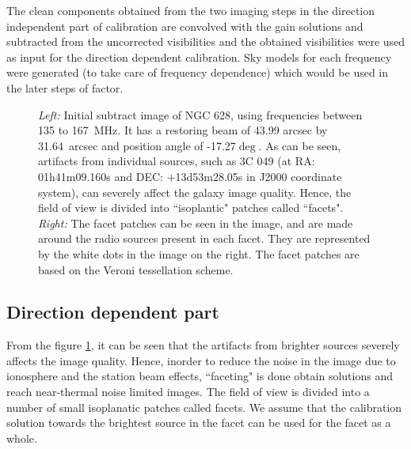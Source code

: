 \documentclass[../main/thesis_msc.tex]{subfiles}
\begin{document}
The clean components obtained from the two imaging steps in the direction independent part of calibration are convolved with the gain solutions and subtracted from the uncorrected visibilities and the obtained visibilities were used as input for the direction dependent calibration. Sky models for each frequency were generated (to take care of frequency dependence) which would be used in the later steps of factor.

\begin{figure}[h]
	\centering
	\caption{\textit{Left:} Initial subtract image of NGC 628, using frequencies between 135 to 167~MHz. It has a restoring beam of 43.99 arcsec by 31.64~arcsec and position angle of -17.27$\deg$. As can be seen, artifacts from individual sources, such as 3C 049 (at RA: 01h41m09.160s and DEC: +13d53m28.05s in J2000 coordinate system), can severely affect the galaxy image quality. Hence, the field of view is divided into ``isoplantic" patches called ``facets". \textit{Right:} The facet patches can be seen in the image, and are made around the radio sources present in each facet. They are represented by the white dots in the image on the right. The facet patches are based on the Veroni tessellation scheme.}
	\label{faceting}
	\end{figure}
	
\subsection{Direction dependent part}

From the figure \ref{faceting}, it can be seen that the artifacts from brighter sources severely affects the image quality. Hence, inorder to reduce the noise in the image due to ionosphere and the station beam effects, ``faceting" is done obtain solutions and reach near-thermal noise limited images. The field of view is divided into a number of small isoplanatic patches called facets. We assume that the calibration solution towards the brightest source in the facet can be used for the facet as a whole.  \\
\end{document}
